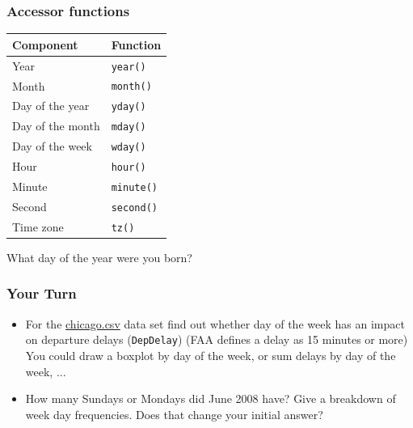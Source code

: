 \documentclass{beamer}\usepackage[]{graphicx}\usepackage[]{color}
\begin{document}
\begin{frame}
\frametitle{Accessor functions}
\begin{minipage}{.6\linewidth}
\centering
\begin{tabular}{ll}\hline
Component & Function\\\hline
Year & \texttt{year()}\\
Month & \texttt{month()}\\
Day of the year & \texttt{yday()}\\
Day of the month & \texttt{mday()}\\
Day of the week & \texttt{wday()}\\
Hour & \texttt{hour()}\\
Minute & \texttt{minute()}\\
Second & \texttt{second()}\\
Time zone & \texttt{tz()}\\\hline
\end{tabular}
\end{minipage}\hfill
\begin{minipage}{.35\linewidth}
What day of the year were you born?
\end{minipage}
\end{frame}

\begin{frame}
\frametitle{Your Turn}
\begin{itemize}
\item For the \href{http://www.hofroe.net/R\%20workshops/02-r-graphics/data/05-data/chicago.csv}{chicago.csv} data set find out
whether day of the week has an impact on
departure delays (\texttt{DepDelay})
(FAA defines a delay as 15 minutes or more)
You could draw a boxplot by day of the week, or
sum delays by day of the week, ...\medskip
\item How many Sundays or Mondays did June 2008 have? Give a breakdown of week day frequencies. Does that change your initial answer?
\end{itemize}
\end{frame}
\end{document}
